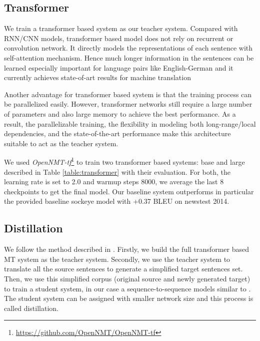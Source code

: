 \documentclass[11pt,a4paper]{article}
\begin{document}
\subsection{Transformer}
\label{transformer}
We train a transformer based system \cite{vaswani2017attention} as our teacher system.
Compared with RNN/CNN models, transformer based model does not rely on recurrent or convolution network.
It directly models the representations of each sentence with self-attention mechanism.
Hence much longer information in the sentences can be learned especially important for language pairs like English-German and it currently achieves state-of-art results for machine translation \cite{DBLP:journals/corr/abs-1803-02155}

Another advantage for transformer based system is that the training process can be parallelized easily.
However, transformer networks still require a large number of parameters and also large memory to achieve the best performance.
As a result, the parallelizable training, the flexibility in modeling both long-range/local
dependencies, and the state-of-the-art performance make this architecture suitable to act as the teacher system.

We used \textit{OpenNMT-tf}\footnote{\url{https://github.com/OpenNMT/OpenNMT-tf}} to train two transformer based systems: base and large described in Table \ref{table:transformer} with their evaluation. For both, the learning rate is set to 2.0 and warmup steps 8000, we average the last 8 checkpoints to get the final model. Our baseline system outperforms in particular the provided baseline sockeye model with +0.37 BLEU on newstest 2014.

\subsection{Distillation}
\label{distill}

We follow the method described in . Firstly, we build the full transformer based MT system \cite{vaswani2017attention} as the teacher system. Secondly, we use the teacher system to translate all the source sentences to generate a simplified target sentences set.
Then, we use this simplified corpus (original source and newly generated target) to train a student system, in our case a sequence-to-sequence models similar to .
The student system can be assigned with smaller network size and this process is called distillation.
\end{document}
